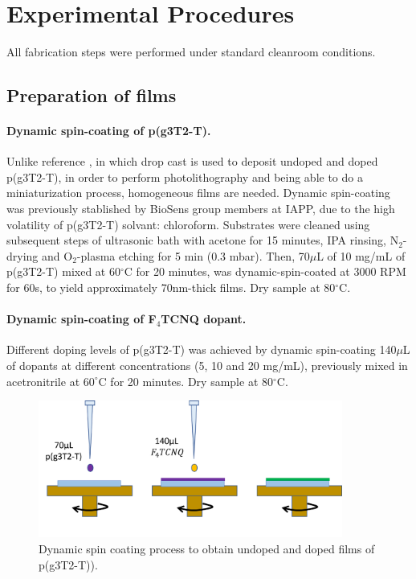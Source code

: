 \section{Experimental Procedures}

All fabrication steps were performed under standard cleanroom conditions.
\subsection{Preparation of films} \label{subsec:films}
\paragraph{Dynamic spin-coating of p(g3T2-T).}Unlike reference \cite{tanTuningOrganicElectrochemical2022}, in which drop cast is used to deposit undoped and doped p(g3T2-T), in order to perform photolithography and being able to do a miniaturization process, homogeneous films are needed. Dynamic spin-coating was previously stablished by BioSens group members at IAPP, due to the high volatility of p(g3T2-T) solvant: chloroform. Substrates were cleaned using subsequent steps of ultrasonic bath with acetone for 15 minutes, IPA rinsing, N$_{2}$-drying and O$_{2}$-plasma etching for 5 min (0.3 mbar). Then, 70$\mu$L of 10 mg/mL of p(g3T2-T) mixed at 60$^{\circ}$C for 20 minutes, was dynamic-spin-coated at 3000 RPM for 60s, to yield approximately 70nm-thick films. Dry sample at 80$^{\circ}$C.

\paragraph{Dynamic spin-coating of F$_{4}$TCNQ dopant.}Different doping levels of p(g3T2-T) was achieved by dynamic spin-coating 140$\mu$L of dopants at different concentrations (5, 10 and 20 mg/mL), previously mixed in acetronitrile at $60^{\circ}$C for 20 minutes. Dry sample at 80$^{\circ}$C.

\begin{figure}[ht]
  \centering
  \includegraphics[width=10cm]{Images/pdf/spin_coating.pdf}
  \caption{Dynamic spin coating process to obtain undoped and doped films of p(g3T2-T)).}
  \label{fig:coating}
\end{figure}

